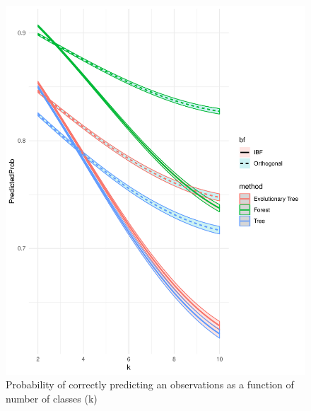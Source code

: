 \documentclass[]{elsarticle} %
\makeatletter
\def\maxwidth{\ifdim\Gin@nat@width>\linewidth\linewidth
\else\Gin@nat@width\fi}
\let\Oldincludegraphics\includegraphics
\renewcommand{\includegraphics}[1]{\Oldincludegraphics[width=\maxwidth]{#1}}
\makeatother
\begin{document}
\begin{figure}[htbp]
\centering
\includegraphics{Trees_with_Base_Functions_v2_files/figure-latex/fig14-estimated-accuracy-k-1.pdf}
\caption{\label{fig:fig14-estimated-accuracy-k}Probability of correctly
predicting an observations as a function of number of classes (k)}
\end{figure}
\end{document}

